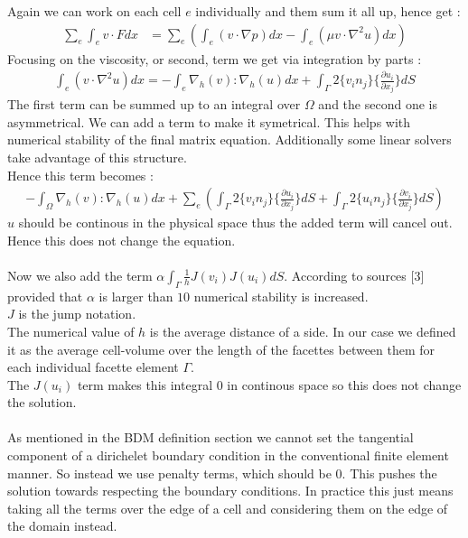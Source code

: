 \documentclass[11pt,twoside,a4paper]{article}
\begin{document}
Again we can work on each cell $e$ individually and them sum it all up, hence get :
\begin{align*}
\sum_e \int_e v \cdot F dx &= \sum_e (\int_e (v \cdot \nabla p) dx - \int_e (\mu v \cdot \nabla^2 u) dx)
\end{align*}
Focusing on the viscosity, or second, term we get via integration by parts :
\begin{align*}
\int_e (v \cdot \nabla^2 u) dx = - \int_e \nabla_h(v) : \nabla_h(u) dx + \int_\Gamma 2 \{ v_i n_j \} \{ \frac{\partial u_i}{\partial x_j}\} dS
\end{align*}
The first term can be summed up to an integral over $\Omega$ and the second one is asymmetrical. We can add a term to make it symetrical. This helps with numerical stability of the final matrix equation. Additionally some linear solvers take advantage of this structure.\\
Hence this term becomes :
\begin{align*}
-  \int_\Omega \nabla_h(v) : \nabla_h(u) dx + \sum_e( \int_\Gamma 2 \{ v_i n_j \} \{ \frac{\partial u_i}{\partial x_j}\} dS + \int_\Gamma 2 \{ u_i n_j \} \{ \frac{\partial v_i}{\partial x_j}\} dS)
\end{align*}
$u$ should be continous in the physical space thus the added term will cancel out. Hence this does not change the equation.\\
\\
Now we also add the term $\alpha \int_\Gamma \frac{1}{h}  J(v_i) J(u_i) dS$. According to sources [3] provided that  $\alpha$ is larger than $10$ numerical stability is increased.\\
$J$ is the jump notation.\\
The numerical value of $h$ is the average distance of a side. In our case we defined it as the average cell-volume over the length of the facettes between them for each individual facette element $\Gamma$.\\
The $J(u_i)$ term makes this integral $0$ in continous space so this does not change the solution.\\
\\
As mentioned in the BDM definition section we cannot set the tangential component of a dirichelet boundary condition in the conventional finite element manner.  So instead we use penalty terms, which should be $0$. This pushes the solution towards respecting the boundary conditions. In practice this just means taking all the terms over the edge of a cell and considering them on the edge of the domain instead.\\
\end{document}
